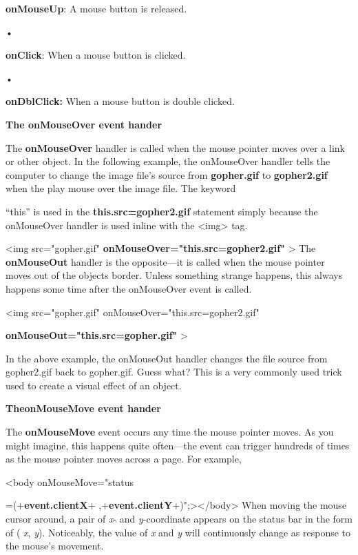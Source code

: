 \documentclass[
]{article}
\begin{document}
\textbf{onMouseUp}: A mouse button is released.

•

\textbf{onClick}: When a mouse button is clicked.

•

\textbf{onDblClick:} When a mouse button is double clicked.

\textbf{The onMouseOver event hander}

The \textbf{onMouseOver} handler is called when the mouse pointer moves
over a link or other object. In the following example, the onMouseOver
handler tells the computer to change the image file's source from
\textbf{gopher.gif} to \textbf{gopher2.gif} when the play mouse over the
image file. The keyword

``this'' is used in the
\textbf{this.src=\textquotesingle gopher2.gif\textquotesingle{}}
statement simply because the onMouseOver handler is used inline with the
\textless img\textgreater{} tag.

\textless img src="gopher.gif"
\textbf{onMouseOver="this.src=\textquotesingle gopher2.gif\textquotesingle"}
\textgreater{} The \textbf{onMouseOut} handler is the opposite---it is
called when the mouse pointer moves out of the object\textquotesingle s
border. Unless something strange happens, this always happens some time
after the onMouseOver event is called.

\textless img src="gopher.gif"
onMouseOver="this.src=\textquotesingle gopher2.gif\textquotesingle"

\textbf{onMouseOut="this.src=\textquotesingle gopher.gif\textquotesingle"}
\textgreater{}

In the above example, the onMouseOut handler changes the file source
from gopher2.gif back to gopher.gif. Guess what? This is a very commonly
used trick used to create a visual effect of an object.

\textbf{TheonMouseMove event hander}

The \textbf{onMouseMove} event occurs any time the mouse pointer moves.
As you might imagine, this happens quite often---the event can trigger
hundreds of times as the mouse pointer moves across a page. For example,

\textless body onMouseMove="status

=\textquotesingle(\textquotesingle+\textbf{event.clientX}+\textquotesingle{}
,\textquotesingle+\textbf{event.clientY}+\textquotesingle)\textquotesingle";\textgreater\textless/body\textgreater{}
When moving the mouse cursor around, a pair of \emph{x}- and
\emph{y}-coordinate appears on the status bar in the form of ( \emph{x},
\emph{y}). Noticeably, the value of \emph{x} and \emph{y} will
continuously change as response to the mouse's movement.
\end{document}
